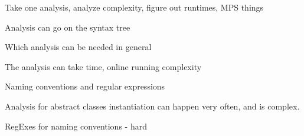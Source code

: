 
Take one analysis, analyze complexity, figure out runtimes, MPS things

 Analysis can go on the syntax tree

 Which analysis can be needed in general
 
 The analysis can take time, online running complexity
 
 Naming conventions and regular expressions


 Analysis for abstract classes instantiation can happen very often, and is complex.
 
 
 
 RegExes for naming conventions - hard